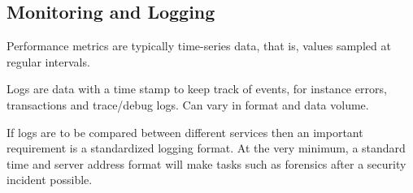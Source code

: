 \documentclass[12pt,a4paper]{article}
\begin{document}

\subsection{Monitoring and Logging} \label{ssec:logging}


%
Performance metrics are typically time-series data, that is, values sampled at regular intervals. 

Logs are data with a time stamp to keep track of events, for instance errors, transactions and trace/debug logs. Can vary in format and data volume.

If logs are to be compared between different services then an important requirement is a standardized logging format. 
At the very minimum, a standard time and server address format will make tasks such as forensics after a security incident possible.
\end{document}
